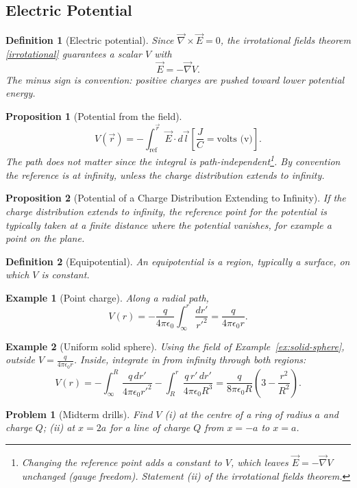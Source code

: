 \documentclass{article}
\newtheorem{definition}{Definition}
\newtheorem{problem}{Problem}
\newtheorem*{example}{Example}
\newtheorem{proposition}{Proposition}
\begin{document}
\subsection{Electric Potential}
\begin{definition}[Electric potential]
    Since $\vec{\nabla}\times\vec{E} = 0$, the irrotational fields theorem \ref{irrotational} guarantees a scalar $V$ with
    \begin{equation}
        \vec{E} = -\vec{\nabla}V.
    \end{equation}
    The minus sign is convention: positive charges are pushed toward lower potential energy.
\end{definition}
\begin{proposition}[Potential from the field]
    \begin{equation}
        V(\vec{r}) = -\int_{\text{ref}}^{\vec{r}}\vec{E}\cdot d\vec{l} \left[\frac{J}{C} = \text{volts (v)}\right].
    \end{equation}
    The path does not matter since the integral is path-independent\footnote{Changing the reference point adds a constant to $V$, which leaves $\vec{E} = -\vec{\nabla}V$ unchanged (gauge freedom). Statement (ii) of the irrotational fields theorem.}. By convention the reference is at infinity, unless the charge distribution extends to infinity.
\end{proposition}
\begin{proposition}[Potential of a Charge Distribution Extending to Infinity]
    If the charge distribution extends to infinity, the reference point for the potential is typically taken at a finite distance where the potential vanishes, for example a point on the plane.
\end{proposition}
\begin{definition}[Equipotential]
    An equipotential is a region, typically a surface, on which $V$ is constant.
\end{definition}
\begin{example}[Point charge]
    Along a radial path,
    \[V(r) = -\frac{q}{4\pi\epsilon_0}\int_\infty^r\frac{dr'}{r'^2} = \frac{q}{4\pi\epsilon_0 r}.\]
\end{example}
\begin{example}[Uniform solid sphere]
    Using the field of Example~\ref{ex:solid-sphere}, outside $V = \frac{q}{4\pi\epsilon_0 r}$. Inside, integrate in from infinity through both regions:
    \[V(r) = -\int_\infty^R\frac{q\,dr'}{4\pi\epsilon_0 r'^2} - \int_R^r\frac{q\,r'\,dr'}{4\pi\epsilon_0 R^3} = \frac{q}{8\pi\epsilon_0 R}\left(3 - \frac{r^2}{R^2}\right).\]
\end{example}
\begin{problem}[Midterm drills]
    Find $V$ (i) at the centre of a ring of radius $a$ and charge $Q$; (ii) at $x = 2a$ for a line of charge $Q$ from $x = -a$ to $x = a$.
\end{problem}
\end{document}
